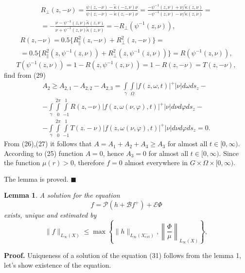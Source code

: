 \documentclass[12pt,reqno]{report}
\newtheorem{lemma}{Lemma}
\begin{document}
\begin{multline}
R_{\bot}(z,-\nu)=\frac{\psi(z,-\nu)-\widetilde{\kappa}(-z,\nu)\nu}
{\psi(z,-\nu)-\widetilde{\kappa}(z,-\nu)\nu}= \frac{-
	\psi^{-1}(z,\nu)+\nu/\widetilde{\kappa}(z,\nu)}{-
	\psi^{-1}(z,\nu)-\nu/\widetilde{\kappa}(z,\nu)}= \\ = -\frac{ \nu -
	\psi^{-1}(z,\nu)\widetilde{\kappa}(z,\nu)}{\nu+
	\psi^{-1}(z,\nu)\widetilde{\kappa}(z,\nu)} =-R_{\bot}(\psi^{-1}(z,\nu)), \nonumber
\end{multline}
\begin{multline}
R(z,-\nu)=0.5\{R^2_{\|}(z,-\nu) +R^2_{\bot}(z,-\nu)\}= \\=
0.5\{R^2_{\|}(z,\psi^{-1}(z,\nu)) +R^2_{\bot}(z,\psi^{-1}(z,\nu))\}=
R(\psi^{-1}(z,\nu)), \nonumber
\end{multline}
$$
T(\psi^{-1}(z,\nu))=1-R(z,\psi^{-1}(z,\nu))=1-R(z,-\nu)=T(z,-\nu),
$$
find from (29)
\begin{multline}
A_2 \geq  A_{2,1}- A_{2,2} - A_{2,3}=  \int \limits_{\gamma} \int \limits_{\Omega}| f
(z,\omega,t)|^+|\nu | d\omega d s_z - 
\\-
\int \limits_{\gamma} \int
\limits^{2\pi}_{0} \int \limits^{1}_{-1} R(z,-\nu)
|f(z,\omega(\nu,\varphi),t)|^+ |\nu| d \nu d \varphi  d s_z - \\-
\int \limits_{\gamma}
\int
\limits^{2\pi}_{0} \int \limits^{1}_{-1} 
T(z.-\nu) |f(z,\omega(\nu,\varphi),t)|^+ |\nu| d \nu d
\varphi  d s_z=0.
\end{multline}
From (26),(27) it follows that $A=A_1+A_2+A_3 \geq A_3$ for almost all
$t\in [0,\infty)$. According to (25) function $A=0$, hence
$A_3=0$ for almost all $t\in [0,\infty)$. Since the function $\mu(r) > 0$,
therefore $f=0$ almost everywhere in $G \times \Omega \times
[0,\infty)$. 


The lemma is proved. 
$\blacksquare$


\begin{lemma}
	A solution for the equation
	\begin{equation}
	f= \mathcal P (h+\mathcal B f^+) + \mathcal E \Phi
	\end{equation}
	exists, unique and estimated by
	\begin{equation}
	\|f\|_{L_{\infty}(X)} \leq \max \left \{ \| h \|_{L_{\infty}(X^-_{ext})}, \left
	\|\frac{\Phi}{\mu} \right\|_{L_{\infty}(X)}\right\},
	\end{equation}
\end{lemma}
{\bf Proof.} Uniqueness of a solution of the equation (31)
follows from the lemma 1, let's show existence of the equation.
\end{document}
